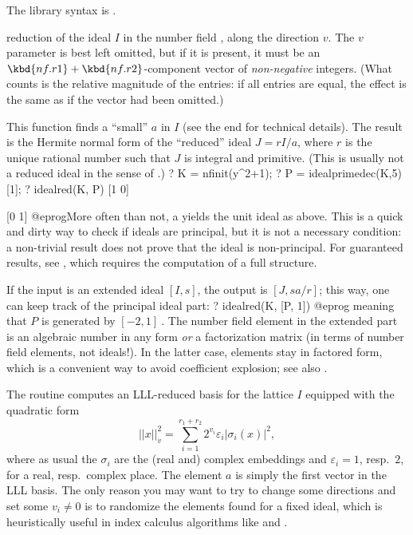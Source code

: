 The library syntax is .

\label{se:idealred}
 reduction of
the ideal $I$ in the number field , along the direction $v$.
The $v$ parameter is best left omitted, but if it is present, it must
be an $\kbd{nf.r1} + \kbd{nf.r2}$-component vector of \emph{non-negative}
integers. (What counts is the relative magnitude of the entries: if all
entries are equal, the effect is the same as if the vector had been omitted.)

This function finds a ``small'' $a$ in $I$ (see the end for technical details).
The result is the Hermite normal form of
the ``reduced'' ideal $J = r I/a$, where $r$ is the unique rational number such
that $J$ is integral and primitive. (This is usually not a reduced ideal in
the sense of .)
\bprog
? K = nfinit(y^2+1);
? P = idealprimedec(K,5)[1];
? idealred(K, P)
[1 0]

[0 1]
@eprog\noindent More often than not, a  yields the unit
ideal as above. This is a quick and dirty way to check if ideals are principal,
but it is not a necessary condition: a non-trivial result does not prove that
the ideal is non-principal. For guaranteed results, see ,
which requires the computation of a full  structure.

If the input is an extended ideal $[I,s]$, the output is $[J,sa/r]$; this way,
one can keep track of the principal ideal part:
\bprog
? idealred(K, [P, 1])
@eprog\noindent
meaning that $P$ is generated by $[-2, 1]~$. The number field element in the
extended part is an algebraic number in any form \emph{or} a factorization
matrix (in terms of number field elements, not ideals!). In the latter case,
elements stay in factored form, which is a convenient way to avoid
coefficient explosion; see also .

 The routine computes an LLL-reduced
basis for the lattice $I$ equipped with the quadratic form
$$|| x ||_v^2 = \sum_{i=1}^{r_1+r_2} 2^{v_i}\varepsilon_i|\sigma_i(x)|^2,$$
where as usual the $\sigma_i$ are the (real and) complex embeddings and
$\varepsilon_i = 1$, resp.~$2$, for a real, resp.~complex place. The element
$a$ is simply the first vector in the LLL basis. The only reason you may want
to try to change some directions and set some $v_i\neq 0$ is to randomize
the elements found for a fixed ideal, which is heuristically useful in index
calculus algorithms like  and .

